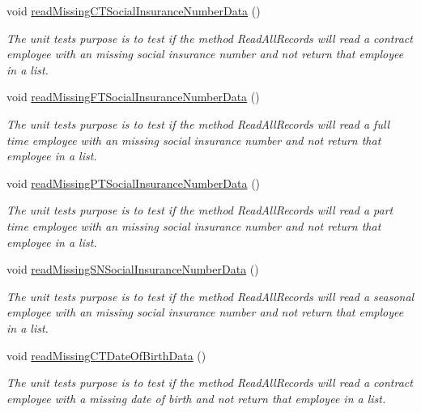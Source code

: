 \begin{DoxyCompactItemize}
void \hyperlink{class_file_i_o_tests_1_1_file_i_o_tests_a78376b361c09ca91f24c4baf66402ce4}{read\+Missing\+C\+T\+Social\+Insurance\+Number\+Data} ()
\begin{DoxyCompactList}\small\item\em The unit test\textquotesingle{}s purpose is to test if the method Read\+All\+Records will read a contract employee with an missing social insurance number and not return that employee in a list. \end{DoxyCompactList}\item 
void \hyperlink{class_file_i_o_tests_1_1_file_i_o_tests_af0277eefc9fcd4eca4c19ad04903fd59}{read\+Missing\+F\+T\+Social\+Insurance\+Number\+Data} ()
\begin{DoxyCompactList}\small\item\em The unit test\textquotesingle{}s purpose is to test if the method Read\+All\+Records will read a full time employee with an missing social insurance number and not return that employee in a list. \end{DoxyCompactList}\item 
void \hyperlink{class_file_i_o_tests_1_1_file_i_o_tests_a643039fe9be4f5293ecf7a3fac07a656}{read\+Missing\+P\+T\+Social\+Insurance\+Number\+Data} ()
\begin{DoxyCompactList}\small\item\em The unit test\textquotesingle{}s purpose is to test if the method Read\+All\+Records will read a part time employee with an missing social insurance number and not return that employee in a list. \end{DoxyCompactList}\item 
void \hyperlink{class_file_i_o_tests_1_1_file_i_o_tests_ae3be09f9751098f2c1387c0712890505}{read\+Missing\+S\+N\+Social\+Insurance\+Number\+Data} ()
\begin{DoxyCompactList}\small\item\em The unit test\textquotesingle{}s purpose is to test if the method Read\+All\+Records will read a seasonal employee with an missing social insurance number and not return that employee in a list. \end{DoxyCompactList}\item 
void \hyperlink{class_file_i_o_tests_1_1_file_i_o_tests_a76329c7f9c306810c578715d5da4449a}{read\+Missing\+C\+T\+Date\+Of\+Birth\+Data} ()
\begin{DoxyCompactList}\small\item\em The unit test\textquotesingle{}s purpose is to test if the method Read\+All\+Records will read a contract employee with a missing date of birth and not return that employee in a list. \end{DoxyCompactList}\item 

\end{DoxyCompactItemize}
